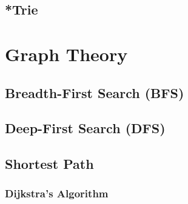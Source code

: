 \documentclass[letterpaper,landscape]{article}
\begin{document}
\subsection{*Trie}

\section{Graph Theory}

\subsection{Breadth-First Search (BFS)}





\subsection{Deep-First Search (DFS)}





\subsection{Shortest Path}

\subsubsection{Dijkstra's Algorithm}


\end{document}
